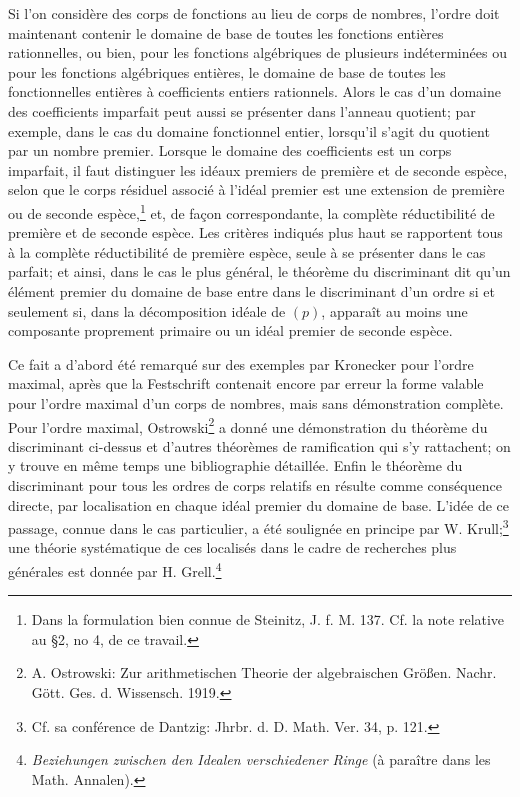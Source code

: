 Si l'on considère des corps de fonctions au lieu de corps de nombres, l'ordre doit maintenant contenir le domaine de base de toutes les fonctions entières rationnelles, ou bien, pour les fonctions algébriques de plusieurs indéterminées ou pour les fonctions algébriques entières, le domaine de base de toutes les fonctionnelles entières à coefficients entiers rationnels. Alors le cas d'un domaine des coefficients imparfait peut aussi se présenter dans l'anneau quotient; par exemple, dans le cas du domaine fonctionnel entier, lorsqu'il s'agit du quotient par un nombre premier. Lorsque le domaine des coefficients est un corps imparfait, il faut distinguer les idéaux premiers de première et de seconde espèce, selon que le corps résiduel associé à l'idéal premier est une extension de première ou de seconde espèce,\footnote{Dans la formulation bien connue de Steinitz, J. f. M. 137. Cf. la note relative au \S 2, no 4, de ce travail.} et, de façon correspondante, la complète réductibilité de première et de seconde espèce. Les critères indiqués plus haut se rapportent tous à la complète réductibilité de première espèce, seule à se présenter dans le cas parfait; et ainsi, dans le cas le plus général, le théorème du discriminant dit qu'un élément premier du domaine de base entre dans le discriminant d'un ordre si et seulement si, dans la décomposition idéale de $(p)$, apparaît au moins une composante proprement primaire ou un idéal premier de seconde espèce.

Ce fait a d'abord été remarqué sur des exemples par Kronecker pour l'ordre maximal, après que la Festschrift contenait encore par erreur la forme valable pour l'ordre maximal d'un corps de nombres, mais sans démonstration complète. Pour l'ordre maximal, Ostrowski\footnote{A. Ostrowski: Zur arithmetischen Theorie der algebraischen Größen. Nachr. Gött. Ges. d. Wissensch. 1919.} a donné une démonstration du théorème du discriminant ci-dessus et d'autres théorèmes de ramification qui s'y rattachent; on y trouve en même temps une bibliographie détaillée. Enfin le théorème du discriminant pour tous les ordres de corps relatifs en résulte comme conséquence directe, par localisation en chaque idéal premier du domaine de base. L'idée de ce passage, connue dans le cas particulier, a été soulignée en principe par W. Krull;\footnote{Cf. sa conférence de Dantzig: Jhrbr. d. D. Math. Ver. 34, p. 121.} une théorie systématique de ces localisés dans le cadre de recherches plus générales est donnée par H. Grell.\footnote{\emph{Beziehungen zwischen den Idealen verschiedener Ringe} (à paraître dans les Math. Annalen).}

